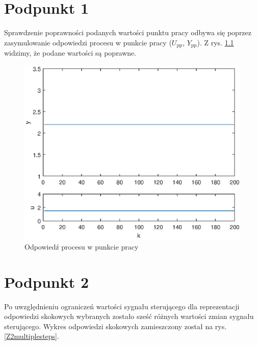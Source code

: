 \chapter{Podpunkt 1}
Sprawdzenie poprawności podanych wartości punktu pracy odbywa się poprzez zasymulowanie odpowiedzi procesu w punkcie pracy ($U_{\mathrm{pp}}$, $Y_{\mathrm{pp}}$). Z rys. \ref{Z1} widzimy, że podane wartości są poprawne.

\begin{figure}[ht]
\centering
\includegraphics[scale=1]{images/Z1}
\caption{Odpowiedź procesu w punkcie pracy}
\label{Z1}
\end{figure}


\chapter{Podpunkt 2}
Po uwzględnieniu ograniczeń wartości sygnału sterującego dla reprezentacji odpowiedzi skokowych wybranych zostało sześć różnych wartości zmian sygnału sterującego. Wykres odpowiedzi skokowych zamieszczony został na rys. \ref{Z2multiplesteps}.

